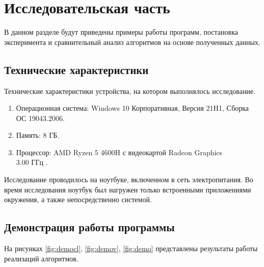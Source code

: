 \chapter{Исследовательская часть}

В данном разделе будут приведены примеры работы программ, постановка эксперимента и сравнительный анализ алгоритмов на основе полученных данных.

\section{Технические характеристики}

Технические характеристики устройства, на котором выполнялось исследование.

\begin{enumerate}
	\item Операционная система: Windows 10 Корпоративная, Версия	21H1, Сборка ОС 19043.2006.
	\item Память: 8 ГБ.
	\item Процессор: AMD Ryzen 5 4600H с видеокартой Radeon Graphics \\3.00 ГГц \cite{processor}.
\end{enumerate}

Исследование проводилось на ноутбуке, включенном в сеть электропитания. Во время исследования ноутбук был нагружен только встроенными приложениями окружения, а также непосредственно системой.

\section{Демонстрация работы программы}

На рисунках \ref{fig:democl}, \ref{fig:demov}, \ref{fig:demo} представлены результаты работы реализаций алгоритмов.

\captionsetup{justification=centering,singlelinecheck=false}

